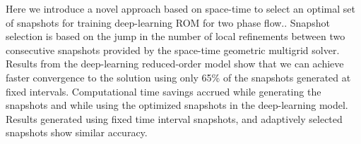 \begin{addmargin}[2em]{0em}
{Here we introduce a novel approach based on space-time to select an optimal set of snapshots for training  deep-learning ROM for two phase flow.. Snapshot selection is based on the jump in the number of local refinements between two consecutive snapshots provided by the space-time  geometric multigrid solver. Results from the deep-learning reduced-order model show that we can achieve faster convergence to the solution using only 65\% of the snapshots generated at fixed intervals. Computational time savings accrued while generating the snapshots and while using the optimized snapshots in the deep-learning model. Results generated using fixed time interval snapshots, and adaptively selected snapshots show similar accuracy.}
\end{addmargin}

